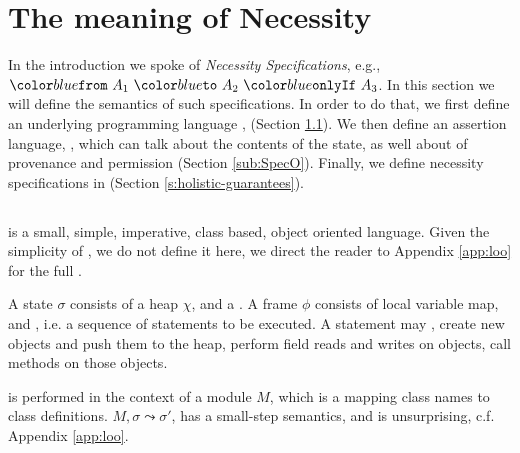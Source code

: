 \section{The meaning of Necessity}
\label{s:semantics}

In the introduction we spoke of \emph{Necessity Specifications}, e.g., $\onlyIf {A_1} {A_2} {A_3}$. 
In this section we will define the semantics of such specifications.
In order to do that, we first define 
an underlying programming language \Loo, (Section \ref{sub:Loo}).
We then  define an assertion language, \SpecO,  which can talk about
 the contents of the state, as well about 
  of provenance and permission (Section \ref{sub:SpecO}).
Finally, we define necessity specifications in \Chainmail (Section \ref{s:holistic-guarantees}).



\subsection{\Loo}
\label{sub:Loo} 
 \Loo is a small, simple, imperative,
class based, object oriented language. 
Given the simplicity of \Loo, we do not
define it here,  we direct the reader to Appendix \ref{app:loo} for 
the full . %

A \Loo state $\sigma$ consists of a 
heap $\chi$, and a .
A frame $\phi$ consists of
local variable map, and , i.e. a sequence of statements to be executed.
 A statement may , create new objects and push them to the heap, 
perform field reads and writes on objects,  
 call methods on those objects. 

 is performed in the context of a module $M$,
which is a mapping
 class names to class definitions. 
  $M, \sigma \leadsto \sigma'$, has a small-step semantics, and is
unsurprising,  c.f. Appendix \ref{app:loo}.
 
